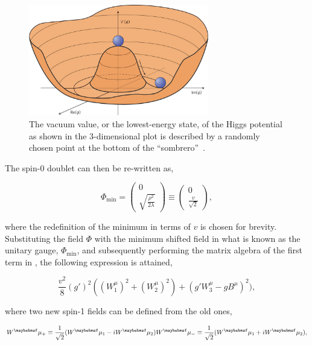 \begin{figure}
  \centering
  \includegraphics[width=0.7\textwidth]{figs/mexhat}
  \caption{The vacuum value, or the lowest-energy state, of the Higgs potential as shown in the 3-dimensional plot is described by a randomly chosen point at the bottom of the ``sombrero''~\cite{Alvarez-Gaume:2010aa}.}
  \label{fig:mexhat}
\end{figure}

The spin-0 doublet can then be re-written as,

\begin{equation}
  \Phi_{\mathrm{min}} = \begin{pmatrix} 0 \\ \sqrt{\frac{\rho^2}{2\lambda}} \end{pmatrix} \equiv \begin{pmatrix} 0 \\ \frac{v}{\sqrt{2}} \end{pmatrix},
  \label{eq:higgsdoublet}
\end{equation}

where the redefinition of the minimum in terms of $v$ is chosen for brevity. Substituting the field $\Phi$ with the minimum shifted field in what is known as the unitary gauge, $\Phi_{\mathrm{min}}$, and subsequently performing the matrix algebra of the first term in , the following expression is attained,

\begin{equation}
  \frac{v^2}{8}(g')^2((W^\mu_1)^2 + (W^\mu_2)^2) + (g'W^\mu_3 - gB^\mu)^2),
  \label{eq:massbreak}
\end{equation} 

where two new spin-1 fields can be defined from the old ones,

\begin{equation}
  W^\mu_{+} \equiv \frac{1}{\sqrt{2}}(W^\mu_1 -iW^\mu_2) \\
  W^\mu_{-} \equiv \frac{1}{\sqrt{2}}(W^\mu_1 +iW^\mu_2),
\end{equation}

